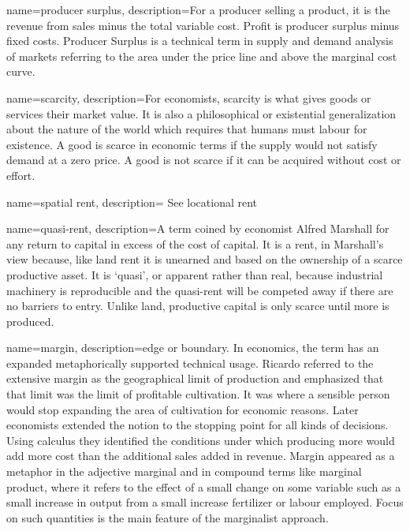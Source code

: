{
name=producer surplus,
description={For a producer selling a product, it is the revenue from sales minus the total variable cost.  Profit is producer surplus minus fixed costs. Producer Surplus is a technical term in supply and demand analysis of markets referring to the area under the price line and above the marginal cost curve.  }
}

{
name=scarcity,
description={For economists, scarcity is what gives goods or services their market value. It is also a philosophical or existential generalization about the nature of the world which requires that humans must labour for existence. A good is scarce in economic terms if the supply would not satisfy demand at a zero price. A good is not scarce if it can be acquired without cost or effort.  }
}

{
name=spatial rent,
description={ See \gls{locational rent}}
}

{
name=quasi-rent,
description={A term coined by economist Alfred Marshall for any return to capital in excess of the cost of capital. It is a rent, in Marshall's view because, like land rent it is unearned and based on the ownership of a scarce productive asset. It is `quasi', or apparent rather than real, because industrial machinery is reproducible and the quasi-rent will be competed away if there are no barriers to entry. Unlike land, productive capital is only scarce until more is produced. }
}


{
name=margin,
description={edge or boundary. In economics, the term has an expanded metaphorically supported technical usage. Ricardo referred to the \gls{extensive margin} as the geographical limit of production and emphasized that that limit was the limit of profitable cultivation. It was where a sensible person would stop expanding the area of cultivation for economic reasons. Later economists extended the notion to the stopping point for all kinds of decisions. Using calculus they identified the conditions under which producing more would add more cost than the additional sales added in revenue.  Margin appeared as a metaphor in the adjective  \gls{marginal} and in compound terms like \gls{marginal product}, where it refers to the effect of a small change on some variable such as a small increase in output from a small increase fertilizer or labour employed. Focus on such quantities is the main feature of the \gls{marginalist} approach. }
}


